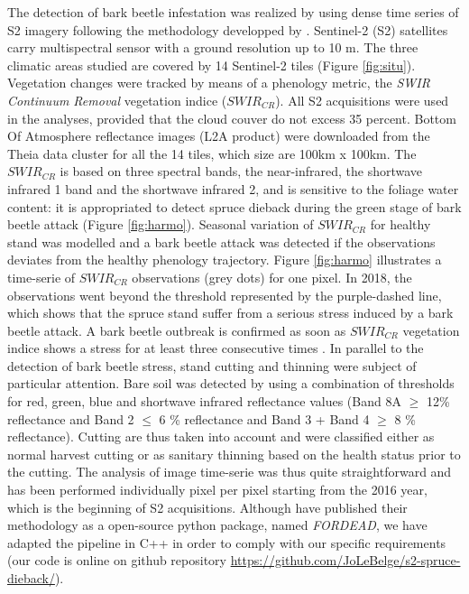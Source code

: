 \documentclass[3p,procedia]{elsarticle}
\begin{document}
The detection of bark beetle infestation was realized by using dense time series of S2 imagery following the methodology developped by \cite{dutrieux_package_2021}.
Sentinel-2 (S2) satellites carry multispectral sensor with a ground resolution up to 10 m.
The three climatic areas studied are covered by 14 Sentinel-2 tiles (Figure \ref{fig:situ}).  
Vegetation changes were tracked by means of a phenology metric, the \textit{SWIR Continuum Removal} vegetation indice ($SWIR_{CR}$).
All S2 acquisitions were used in the analyses, provided that the cloud couver do not excess 35 percent. 
Bottom Of Atmosphere reflectance images (L2A product) were downloaded from the Theia data cluster \citep{theia_team} for all the 14 tiles, which size are 100km x 100km.
The $SWIR_{CR}$ is based on three spectral bands, the near-infrared, the shortwave infrared 1 band and the shortwave infrared 2, and is sensitive to the foliage water content: it is appropriated to detect spruce dieback during the green stage of bark beetle attack (Figure \ref{fig:harmo}).
Seasonal variation of $SWIR_{CR}$ for healthy stand was modelled and a bark beetle attack was detected if the observations deviates from the healthy phenology trajectory. 
Figure \ref{fig:harmo} illustrates a time-serie of $SWIR_{CR}$ observations (grey dots) for one pixel. 
In 2018, the observations went beyond the threshold represented by the purple-dashed line, which shows that the spruce stand suffer from a serious stress induced by a bark beetle attack.
A bark beetle outbreak is confirmed as soon as $SWIR_{CR}$ vegetation indice shows a stress for at least three consecutive times \cite{dutrieux_package_2021}.
In parallel to the detection of bark beetle stress, stand cutting and thinning were subject of particular attention. 
Bare soil was detected by using a combination of thresholds for red, green, blue and shortwave infrared reflectance values (Band 8A $\geq$ 12\% reflectance and Band 2 $\leq$ 6 \% reflectance and Band 3 + Band 4 $\geq$ 8 \% reflectance).
Cutting are thus taken into account and were classified either as normal harvest cutting or as sanitary thinning based on the health status prior to the cutting.
The analysis of image time-serie was thus quite straightforward and has been performed individually pixel per pixel starting from the 2016 year, which is the beginning of S2 acquisitions. 
Although \cite{dutrieux_package_2021} have published their methodology as a open-source python package, named \textit{FORDEAD}, we have adapted the pipeline in C++ in order to comply with our specific requirements (our code is online on github repository \url{https://github.com/JoLeBelge/s2-spruce-dieback/}). 
\end{document}
